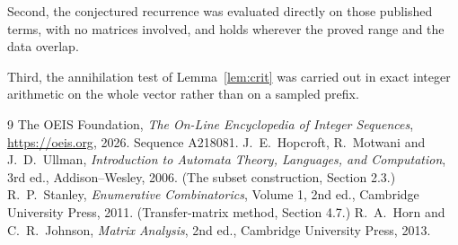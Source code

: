 \documentclass[11pt,a4paper]{article}
\theoremstyle{plain}
\theoremstyle{definition}
\begin{document}
Second, the conjectured recurrence was evaluated directly on those published terms, with no
matrices involved, and holds wherever the proved range and the data overlap.

Third, the annihilation test of Lemma~\ref{lem:crit} was carried out in exact integer
arithmetic on the whole vector rather than on a sampled prefix.

\begin{thebibliography}{9}
 The OEIS Foundation, \emph{The On-Line Encyclopedia of Integer
Sequences}, \url{https://oeis.org}, 2026. Sequence A218081.
 J.~E.~Hopcroft, R.~Motwani and J.~D.~Ullman, \emph{Introduction to Automata
Theory, Languages, and Computation}, 3rd ed., Addison--Wesley, 2006. (The subset
construction, Section 2.3.)
 R.~P.~Stanley, \emph{Enumerative Combinatorics}, Volume 1, 2nd ed.,
Cambridge University Press, 2011. (Transfer-matrix method, Section 4.7.)
 R.~A.~Horn and C.~R.~Johnson, \emph{Matrix Analysis}, 2nd ed., Cambridge
University Press, 2013.
\end{thebibliography}
\end{document}
